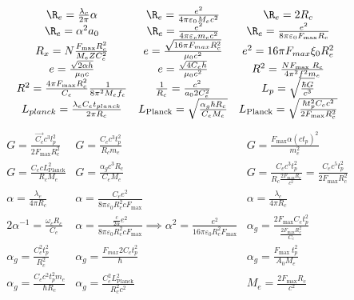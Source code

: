     \begin{gather*}
        \begin{array}{ccc}
            \R_e = \frac{\lambda_c}{2 \pi} \alpha & \R_e = \frac{e^2}{4 \pi \varepsilon_0 M_e c^2} & \R_e = 2 R_c \\
            \R_e = \alpha^2 a_0 & \R_e = \frac{e^2}{4 \pi \varepsilon_c m_c c^2} & \R_e = \frac{e^2}{8 \pi \varepsilon_0 F_{\max} R_c} \\
            R_x = N \frac{F_{\max} R_c^2}{M_e Z C_e^2} & e = \frac{\sqrt{16 \pi F_{max} R_c^2}}{\mu_0 c^2} & e^2 = 16 \pi F_{max} \xi_0 R_e^2 \\
            e = \frac{\sqrt{2 \alpha h}}{\mu_0 c} & e = \frac{\sqrt{4 C_e h}}{\mu_0 c^2} & R^2 = \frac{N F_{\text {max }} R_c}{4 \pi^2 f^2 m_e} \\
            R^2 = \frac{4 \pi F_{\max} R_c^2}{C_e} \frac{1}{8 \pi^2 M_e f_e} & \frac{1}{R_c} = \frac{c^2}{a_0 2 C_e^2} & {L_p} = \sqrt{\frac{\hbar G}{c^3}} \\
            L_{planck} = \frac{\lambda_e C_e t_{planck}}{2 \pi R_c} & L_\text{Planck} = \sqrt{\frac{\alpha_g \hbar R_c}{C_e M_e}} & L_\text{Planck} = \sqrt{\frac{\hbar t_p^2 C_e c^2}{2 F_{\max} R_c^2}} \\
        \end{array}
    \end{gather*}
\begin{gather*}
    \begin{array}{ccc}
            G = \frac{\vec{C_e} c^3 l_p^2}{2 F_{\max } R_c^2} & G = \frac{C_e c^3 t_p^2}{R_c m_e} & G = \frac{F_{\operatorname{max}} \alpha (c t_p)^2}{m_e^2} \\
            G = \frac{C_e c L_\text{Planck}^2}{R_c M_e} & G = \frac{\alpha_g c^3 R_c}{C_e M_e} & G = \frac{C_e c^3 t_p^2}{R_c \frac{2 F_{\max} R_c}{c^2}} = \frac{C_e c^5 t_p^2}{2 F_{\max} R_c^2} \\
            \alpha = \frac{\lambda_e}{4 \pi R_c} & \alpha = \frac{C_e e^2}{8 \pi \varepsilon_0 R_c^2 c F_{\max}} & \alpha = \frac{\lambda_c}{4 \pi R_c} \\
            2\alpha^{-1} = \frac{\omega_c R_c}{C_e} & \alpha = \frac{\frac{c}{2 \alpha} e^2}{8 \pi \varepsilon_0 R_c^2 c F_{\max}} \implies \alpha^2 = \frac{e^2}{16 \pi \varepsilon_0 R_c^2 F_{\max}} & \alpha_g = \frac{2F_{\max} C_e t_p^2}{\frac{2F_{\max} R_c^2}{C_e}} \\
            \alpha_g = \frac{C_e^2 t_p^2}{R_c^2} & \alpha_g = \frac{F_{max} 2 C_e t_p^2}{\hbar} & \alpha_g = \frac{F_{\text {max }} t_p^2}{A_0 M_e} \\
            \alpha_g = \frac{C_e c^2 t_p^2 m_e}{\hbar R_c} & \alpha_g = \frac{C_e^2 L_\text{Planck}^2}{R_c^2 c^2} & M_e = \frac{2 F_{\max} R_c}{c^2} \\
        \end{array}
    \end{gather*}

